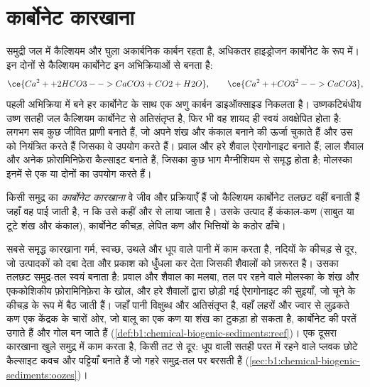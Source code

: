\section{कार्बोनेट कारखाना}\label{sec:b1:chemical-biogenic-sediments:factory}

समुद्री जल में कैल्शियम और घुला अकार्बनिक कार्बन रहता है, अधिकतर हाइड्रोजन कार्बोनेट के रूप में। इन दोनों से कैल्शियम कार्बोनेट इन अभिक्रियाओं से बनता है:
\[
\ce{Ca^2+ + 2 HCO3- -> CaCO3 + CO2 + H2O}, \qquad
\ce{Ca^2+ + CO3^2- -> CaCO3},
\]
पहली अभिक्रिया में बने हर कार्बोनेट के साथ एक अणु कार्बन डाइऑक्साइड निकलता है। उष्णकटिबंधीय उष्ण सतही जल कैल्शियम कार्बोनेट से अतिसंतृप्त है, फिर भी वह शायद ही स्वयं अवक्षेपित होता है: लगभग सब कुछ जीवित प्राणी बनाते हैं, जो अपने शंख और कंकाल बनाने की ऊर्जा चुकाते हैं और उस  को नियंत्रित करते हैं जिसका वे उपयोग करते हैं। प्रवाल और हरे शैवाल ऐरागोनाइट बनाते हैं; लाल शैवाल और अनेक फ़ोरामिनिफ़ेरा कैल्साइट बनाते हैं, जिसका कुछ भाग मैग्नीशियम से समृद्ध होता है; मोलस्का इनमें से एक या दोनों का उपयोग करते हैं।

\begin{definition}[कार्बोनेट कारखाना]\label{def:b1:chemical-biogenic-sediments:factory}
किसी समुद्र का \emph{कार्बोनेट कारखाना} वे जीव और प्रक्रियाएँ हैं जो कैल्शियम कार्बोनेट तलछट वहीं बनाती हैं जहाँ वह पाई जाती है, न कि उसे कहीं और से लाया जाता है। उसके उत्पाद हैं कंकाल-कण (साबुत या टूटे शंख और कंकाल), कार्बोनेट कीचड़, लेपित कण और भित्तियों के कठोर ढाँचे।
\end{definition}

सबसे समृद्ध कारखाना गर्म, स्वच्छ, उथले और धूप वाले पानी में काम करता है, नदियों के कीचड़ से दूर, जो उत्पादकों को दबा देता और प्रकाश को धुँधला कर देता जिसकी शैवालों को ज़रूरत है। उसका तलछट समुद्र-तल स्वयं बनाता है: प्रवाल और शैवाल का मलबा, तल पर रहने वाले मोलस्का के शंख और एककोशिकीय फ़ोरामिनिफ़ेरा के खोल, और हरे शैवालों द्वारा छोड़ी गई ऐरागोनाइट की सुइयाँ, जो चूने के कीचड़ के रूप में बैठ जाती हैं। जहाँ पानी विक्षुब्ध और अतिसंतृप्त है, वहाँ लहरों और ज्वार से लुढ़कते कण एक केंद्रक के चारों ओर, जो बालू का एक कण या शंख का टुकड़ा हो सकता है, कार्बोनेट की परतें उगाते हैं और गोल  बन जाते हैं (\cref{def:b1:chemical-biogenic-sediments:reef})। एक दूसरा कारखाना खुले समुद्र में काम करता है, किसी तट से दूर: धूप वाली सतही परत में रहने वाले प्लवक छोटे कैल्साइट कवच और पट्टियाँ बनाते हैं जो गहरे समुद्र-तल पर बरसती हैं (\cref{sec:b1:chemical-biogenic-sediments:oozes})।

